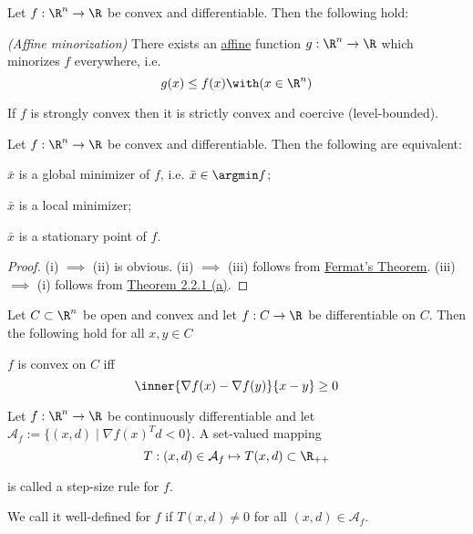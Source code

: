 \label{aa63a8a}

Let $f:\R^n\to\R$ be convex and differentiable. Then the following
hold:
\begin{enumerata}
	\item \textit{(Affine minorization)} There exists an
	\href{dcb7f73}{affine} function $g:\R^n\to\R$ which minorizes
	$f$ everywhere, i.e.
	$$
		g(x)\leq f(x)\with(x\in\R^n)
	$$
	\item If $f$ is strongly convex then it is strictly convex and
	coercive (level-bounded).
\end{enumerata}

\label{f2986e2}

Let $f:\R^n\to\R$ be convex and differentiable. Then the following
are equivalent:
\begin{enumeratr}
	\item $\bar x$ is a global minimizer of $f$, i.e. $\bar x\in\argmin f$;
	\item $\bar x$ is a local minimizer;
	\item $\bar x$ is a stationary point of $f$.
\end{enumeratr}

\begin{proof}
	(i) $\implies$ (ii) is obvious. (ii) $\implies$ (iii) follows from
	\href{dc165c9}{Fermat's Theorem}. (iii) $\implies$ (i) follows
	from \href{cd9cea7}{Theorem 2.2.1 (a)}.
\end{proof}

\label{a8ddd0c}

Let $C\subset\R^n$ be open and convex and let $f:C\to\R$ be
differentiable on $C$. Then the following hold for all $x,y\in C$
\begin{enumerata}
	\item $f$ is convex on $C$ iff
	\begin{equation}
		\inner{\nabla f(x)-\nabla f(y)}{x-y}\geq0
	\end{equation}
\end{enumerata}

\label{ae4eac6}

Let $f:{\R}^n\to{\R}$ be continuously differentiable and
let $\mathcal A_f:=\{(x,d)\mid\nabla f(x)^Td<0\}$. A set-valued
mapping
$$
	T:(x,d)\in\mathcal A_f\mapsto T(x,d)\subset\R_{++}
$$

is called a step-size rule for $f$.

We call it well-defined for $f$ if $T(x,d)\neq0$ for all
$(x,d)\in\mathcal{A}_f$.

